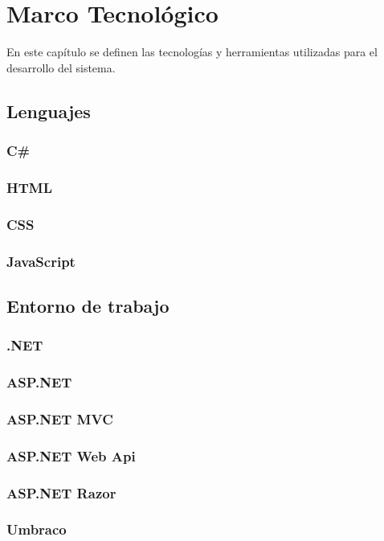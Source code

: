 \chapter{Marco Tecnológico}
En este capítulo se definen las tecnologías y herramientas utilizadas para el desarrollo del sistema.


\section{Lenguajes}
\subsection{C\#}
\subsection{HTML}
\subsection{CSS}
\subsection{JavaScript}

\section{Entorno de trabajo}
\subsection{.NET}
\subsection{ASP.NET}
\subsection{ASP.NET MVC}
\subsection{ASP.NET Web Api}
\subsection{ASP.NET Razor}
\subsection{Umbraco}

